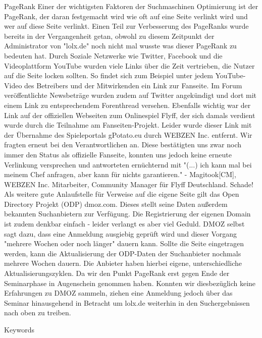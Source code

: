PageRank
Einer der wichtigsten Faktoren der Suchmaschinen Optimierung ist der PageRank, der daran festgemacht wird wie oft auf eine Seite verlinkt wird und wer auf diese Seite verlinkt. Einen Teil zur Verbesserung des PageRanks wurde bereits in der Vergangenheit getan, obwohl zu diesem Zeitpunkt der Administrator von "lolx.de" noch nicht mal wusste was dieser PageRank zu bedeuten hat.
Durch Soziale Netzwerke wie Twitter, Facebook und die Videoplattform YouTube wurden viele Links über die Zeit vertrieben, die Nutzer auf die Seite locken sollten. So findet sich zum Beispiel unter jedem YouTube-Video des Betreibers und der Mitwirkenden ein Link zur Fanseite. Im Forum veröffentlichte Newsbeträge wurden zudem auf Twitter angekündigt und dort mit einem Link zu entsprechendem Forenthread versehen.
Ebenfalls wichtig war der Link auf der offiziellen Webseiten zum Onlinespiel Flyff, der sich damals verdient wurde durch die Teilnahme am Fanseiten-Projekt. Leider wurde dieser Link mit der Übernahme des Spieleportals gPotato.eu durch WEBZEN Inc. entfernt. Wir fragten erneut bei den Verantwortlichen an. Diese bestätigten uns zwar noch immer den Status als offizielle Fanseite, konnten uns jedoch keine erneute Verlinkung versprechen und antworteten ernüchternd mit "(...) ich kann mal bei meinem Chef anfragen, aber kann für nichts garantieren." - Magitook[CM], WEBZEN Inc. Mitarbeiter, Community Manager für Flyff Deutschland. Schade!
Als weitere gute Anlaufstelle für Verweise auf die eigene Seite gilt das Open Directory Projekt (ODP) dmoz.com. Dieses stellt seine Daten außerdem bekannten Suchanbietern zur Verfügung. Die Registrierung der eigenen Domain ist zudem denkbar einfach - leider verlangt es aber viel Geduld. DMOZ selbst sagt dazu, dass eine Anmeldung ausgiebig geprüft wird und dieser Vorgang "mehrere Wochen oder noch länger" dauern kann. Sollte die Seite eingetragen werden, kann die Aktualisierung der ODP-Daten der Suchanbieter nochmals mehrere Wochen dauern. Die Anbieter haben hierbei eigene, unterschiedliche Aktualisierungszyklen.
Da wir den Punkt PageRank erst gegen Ende der Seminarphase in Augenschein genommen haben. Konnten wir diesbezüglich keine Erfahrungen zu DMOZ sammeln, ziehen eine Anmeldung jedoch über das Seminar hinausgehend in Betracht um lolx.de weiterhin in den Suchergebnissen nach oben zu treiben.



Keywords
